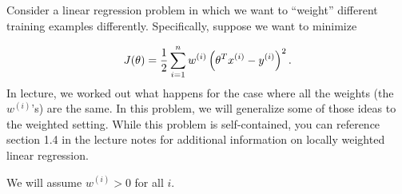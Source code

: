 \item {} Consider a linear regression problem in which
we want to ``weight'' different training examples differently.  Specifically,
suppose we want to minimize
%

\begin{equation*}
	J(\theta) = \frac{1}{2} \sum_{i=1}^{n} w^{(i)}
		\left(\theta^Tx^{(i)} - y^{(i)}\right)^2.
\end{equation*}
%
In lecture, we worked out what happens for the case where all the weights (the
$w^{(i)}$'s) are the same. In this problem, we will generalize some of those
ideas to the weighted setting. While this problem is self-contained, you can reference section 1.4 in the lecture notes for additional information on locally weighted linear regression. 

\bigskip

We will assume $w^{(i)} > 0$ for all $i$. 

